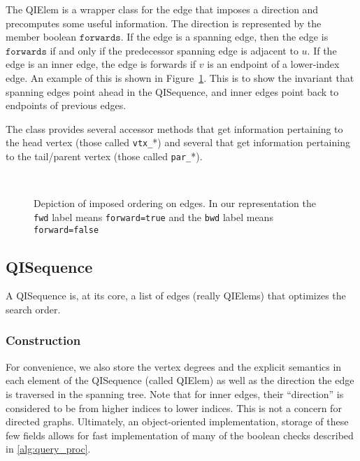 The QIElem is a wrapper class for the edge that imposes a direction and
precomputes some useful information. The direction is represented by the member
boolean $\texttt{forwards}$. If the edge is a spanning edge, then the edge is
$\texttt{forwards}$ if and only if the predecessor spanning edge is adjacent to
$u$. If the edge is an inner edge, the edge is forwards if $v$ is an endpoint of
a lower-index edge. An example of this is shown in
Figure~\ref{fig:qi_elem}. This is to show the invariant that spanning edges
point ahead in the QISequence, and inner edges point back to endpoints of
previous edges.

The class provides several accessor methods that get information pertaining to
the head vertex (those called \texttt{vtx\_}*)  and several that get information
pertaining to the tail/parent vertex (those called \texttt{par\_}*).

\begin{figure} \centering
  \\[1cm]
  
  \label{fig:qi_elem}
  \caption{Depiction of imposed ordering on edges. In our representation the
    \texttt{fwd} label means \texttt{forward=true} and the \texttt{bwd} label
    means \texttt{forward=false}}
\end{figure}


\subsection{QISequence}

A QISequence is, at its core, a list of edges (really QIElems) that optimizes
the search order.

\subsubsection{Construction}
For convenience, we also store the vertex degrees and the explicit semantics in
each element of the QISequence (called QIElem) as well as the direction the edge
is traversed in the spanning tree. Note that for inner edges, their
``direction'' is considered to be from higher indices to lower indices.  This is
not a concern for directed graphs. Ultimately, an object-oriented
implementation, storage of these few fields allows for fast implementation of
many of the boolean checks described in \ref{alg:query_proc}.

